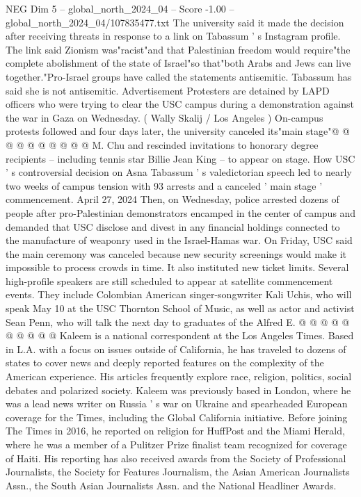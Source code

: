 \begin{textsample}{NEG Dim 5 – global\_north\_2024\_04 – Score -1.00 – global\_north\_2024\_04/107835477.txt}
The university said it made the decision after receiving threats in response to a link on Tabassum ' s Instagram profile.
The link said Zionism was"racist"and that Palestinian freedom would require"the complete abolishment of the state of Israel"so that"both Arabs and Jews can live together."Pro-Israel groups have called the statements antisemitic.
Tabassum has said she is not antisemitic.
Advertisement Protesters are detained by LAPD officers who were trying to clear the USC campus during a demonstration against the war in Gaza on Wednesday. ( Wally Skalij / Los Angeles ) On-campus protests followed and four days later, the university canceled its"main stage"@ @ @ @ @ @ @ @ @ @ M.
Chu and rescinded invitations to honorary degree recipients -- including tennis star Billie Jean King -- to appear on stage.
How USC ' s controversial decision on Asna Tabassum ' s valedictorian speech led to nearly two weeks of campus tension with 93 arrests and a canceled ' main stage ' commencement.
April 27, 2024 Then, on Wednesday, police arrested dozens of people after pro-Palestinian demonstrators encamped in the center of campus and demanded that USC disclose and divest in any financial holdings connected to the manufacture of weaponry used in the Israel-Hamas war.
On Friday, USC said the main ceremony was canceled because new security screenings would make it impossible to process crowds in time.
It also instituted new ticket limits.
Several high-profile speakers are still scheduled to appear at satellite commencement events.
They include Colombian American singer-songwriter Kali Uchis, who will speak May 10 at the USC Thornton School of Music, as well as actor and activist Sean Penn, who will talk the next day to graduates of the Alfred E. @ @ @ @ @ @ @ @ @ @ Kaleem is a national correspondent at the Los Angeles Times.
Based in L.A. with a focus on issues outside of California, he has traveled to dozens of states to cover news and deeply reported features on the complexity of the American experience.
His articles frequently explore race, religion, politics, social debates and polarized society.
Kaleem was previously based in London, where he was a lead news writer on Russia ' s war on Ukraine and spearheaded European coverage for the Times, including the Global California initiative.
Before joining The Times in 2016, he reported on religion for HuffPost and the Miami Herald, where he was a member of a Pulitzer Prize finalist team recognized for coverage of Haiti.
His reporting has also received awards from the Society of Professional Journalists, the Society for Features Journalism, the Asian American Journalists Assn., the South Asian Journalists Assn. and the National Headliner Awards.

\end{textsample}
